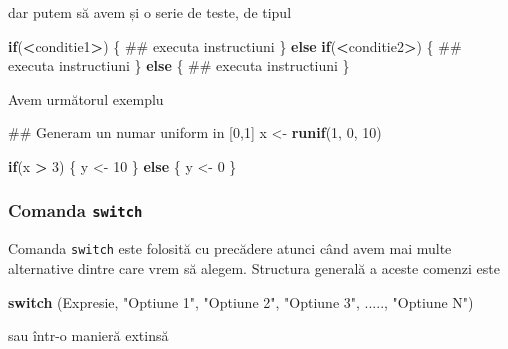 \documentclass[]{article}
\newenvironment{Shaded}{\begin{snugshade}}{\end{snugshade}}
\newcommand{\KeywordTok}[1]{\textcolor[rgb]{0.13,0.29,0.53}{\textbf{#1}}}
\newcommand{\DecValTok}[1]{\textcolor[rgb]{0.00,0.00,0.81}{#1}}
\newcommand{\StringTok}[1]{\textcolor[rgb]{0.31,0.60,0.02}{#1}}
\newcommand{\ControlFlowTok}[1]{\textcolor[rgb]{0.13,0.29,0.53}{\textbf{#1}}}
\newcommand{\OperatorTok}[1]{\textcolor[rgb]{0.81,0.36,0.00}{\textbf{#1}}}
\newcommand{\NormalTok}[1]{#1}
\begin{document}
dar putem să avem și o serie de teste, de tipul

\begin{Shaded}
\begin{Highlighting}[]
\ControlFlowTok{if}\NormalTok{(}\OperatorTok{<}\NormalTok{conditie1}\OperatorTok{>}\NormalTok{) \{}
\NormalTok{        ## executa instructiuni}
\NormalTok{\} }\ControlFlowTok{else} \ControlFlowTok{if}\NormalTok{(}\OperatorTok{<}\NormalTok{conditie2}\OperatorTok{>}\NormalTok{)  \{}
\NormalTok{        ## executa instructiuni}
\NormalTok{\} }\ControlFlowTok{else}\NormalTok{ \{}
\NormalTok{        ## executa instructiuni}
\NormalTok{\}}
\end{Highlighting}
\end{Shaded}

Avem următorul exemplu

\begin{Shaded}
\begin{Highlighting}[]
\NormalTok{## Generam un numar uniform in [0,1]}
\NormalTok{x <-}\StringTok{ }\KeywordTok{runif}\NormalTok{(}\DecValTok{1}\NormalTok{, }\DecValTok{0}\NormalTok{, }\DecValTok{10}\NormalTok{)  }

\ControlFlowTok{if}\NormalTok{(x }\OperatorTok{>}\StringTok{ }\DecValTok{3}\NormalTok{) \{}
\NormalTok{        y <-}\StringTok{ }\DecValTok{10}
\NormalTok{\} }\ControlFlowTok{else}\NormalTok{ \{}
\NormalTok{        y <-}\StringTok{ }\DecValTok{0}
\NormalTok{\}}
\end{Highlighting}
\end{Shaded}

\subsubsection{\texorpdfstring{Comanda
\texttt{switch}}{Comanda switch}}\label{comanda-switch}

Comanda \texttt{switch} este folosită cu precădere atunci când avem mai
multe alternative dintre care vrem să alegem. Structura generală a
aceste comenzi este

\begin{Shaded}
\begin{Highlighting}[]
\ControlFlowTok{switch}\NormalTok{ (Expresie, }\StringTok{"Optiune 1"}\NormalTok{, }\StringTok{"Optiune 2"}\NormalTok{, }\StringTok{"Optiune 3"}\NormalTok{, ....., }\StringTok{"Optiune N"}\NormalTok{)}
\end{Highlighting}
\end{Shaded}

sau într-o manieră extinsă
\end{document}
